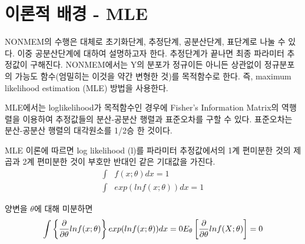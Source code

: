 \documentclass[
  10pt,
  krantz2,
  a4paper]{krantz}
\theoremstyle{definition}
\theoremstyle{definition}
\theoremstyle{definition}
\theoremstyle{remark}
\begin{document}

\hypertarget{uxc774uxb860uxc801-uxbc30uxacbd---mle}{%
\section{이론적 배경 - MLE}\label{uxc774uxb860uxc801-uxbc30uxacbd---mle}}


NONMEM의 수행은 대체로 초기화단계, 추정단계, 공분산단계, 표단계로 나눌 수 있다. 이중 공분산단계에 대하여 설명하고자 한다. 추정단계가 끝나면 최종 파라미터 추정값이 구해진다. NONMEM에서는 Y의 분포가 정규이든 아니든 상관없이 정규분포의 가능도 함수(엄밀히는 이것을 약간 변형한 것)를 목적함수로 한다. 즉, maximum likelihood estimation (MLE) 방법을 사용한다.

MLE에서는 loglikelihood가 목적함수인 경우에 Fisher's Information Matrix의 역행렬을 이용하여 추정값들의 분산-공분산 행렬과 표준오차를 구할 수 있다. 표준오차는 분산-공분산 행렬의 대각원소를 1/2승 한 것이다.

MLE 이론에 따르면 log likelihood (l)를 파라미터 추정값에서의 1계 편미분한 것의 제곱과 2계 편미분한 것이 부호만 반대인 같은 기대값을 가진다.
\begin{equation}
\begin{split}
  \int & f(x;\theta)dx = 1 \\
  \int & exp(lnf(x;\theta))dx = 1
\end{split}
\label{eq:mle-theory}
\end{equation}

양변을 \(\theta\)에 대해 미분하면
\begin{equation}
\int\left\{ \frac{\partial}{\partial\theta}lnf(x;\theta) \right\} exp(lnf(x;\theta))dx = 0 \\
E_{\theta}\left\lbrack \frac{\partial}{\partial\theta}lnf(X;\theta) \right\rbrack = 0
\label{eq:theta-differential}
\end{equation}
\end{document}
